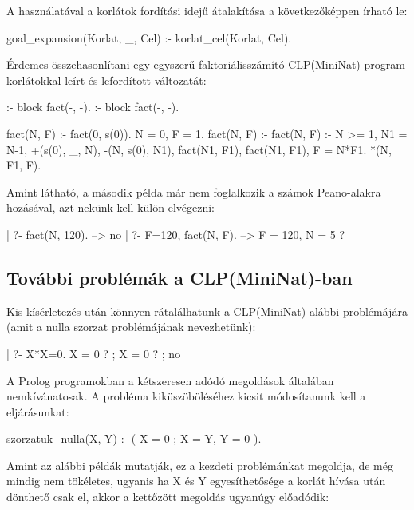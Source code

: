A  használatával a korlátok fordítási idejű átalakítása
a következőképpen írható le:

\begin{prologcode}
goal_expansion({Korlat}, _, Cel) :- korlat_cel(Korlat, Cel).
\end{prologcode}

Érdemes összehasonlítani egy egyszerű faktoriálisszámító CLP(MiniNat)
program korlátokkal leírt és lefordított változatát:

\begin{prologcode}
:- block fact(-, -).          :- block fact(-, -).

fact(N, F) :-                 fact(0, s(0)).
    {N = 0, F = 1}.
fact(N, F) :-                 fact(N, F) :-
    {N >= 1, N1 = N-1},           +(s(0), _, N),
                                  -(N, s(0), N1),
    fact(N1, F1),                 fact(N1, F1),
    {F = N*F1}.                   *(N, F1, F).
\end{prologcode}

Amint látható, a második példa már nem foglalkozik a számok Peano-alakra
hozásával, azt nekünk kell külön elvégezni:

\begin{prologcode}
| ?- fact(N, 120).          --> no 
| ?- {F=120}, fact(N, F).   --> F = 120, N = 5 ?
\end{prologcode}

\subsection{További problémák a CLP(MiniNat)-ban}

Kis kísérletezés után könnyen rátalálhatunk a CLP(MiniNat) alábbi problémájára
(amit a nulla szorzat problémájának nevezhetünk):

\begin{prologcode}
| ?- {X*X=0}.
X = 0 ? ; X = 0 ? ; no
\end{prologcode}

A Prolog programokban a kétszeresen adódó megoldások általában nemkívánatosak.
A probléma kiküszöböléséhez kicsit módosítanunk kell a 
eljárásunkat:

\begin{prologcode}
szorzatuk_nulla(X, Y) :-
        (   X = 0 
        ;   X \== Y, Y = 0 
        ).
\end{prologcode}

Amint az alábbi példák mutatják, ez a kezdeti problémánkat megoldja, de
még mindig nem tökéletes, ugyanis ha X és Y egyesíthetősége a korlát hívása
után dönthető csak el, akkor a kettőzött megoldás ugyanúgy előadódik:

